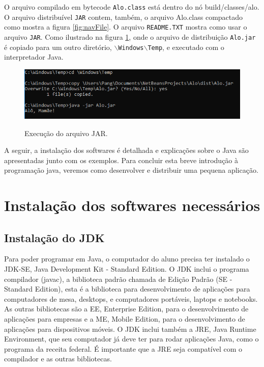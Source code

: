 \documentclass[
	12pt,				%
	twoside,			%
	a4paper,			%
	english,			%
	french,				%
	spanish,			%
	brazil				%
	]{abntex2}
\begin{document}
O arquivo compilado em bytecode \texttt{Alo.class} está dentro do nó build/classes/alo. O arquivo distribuível \texttt{JAR} contem, também, o arquivo Alo.class compactado como mostra a figura \ref{fig:navFile}. O arquivo \texttt{README.TXT} mostra como usar o arquivo \texttt{JAR}. Como ilustrado na figura \ref{fig:execJar}, onde o arquivo de distribuição \texttt{Alo.jar} é copiado para um outro diretório, \texttt{$\backslash$Windows$\backslash$Temp}, e executado com o interpretador Java.

\begin{figure}[h]
\begin{center}
\includegraphics[scale=0.4]{execJar.png} 
\caption{Execução do arquivo JAR.}
\label{fig:execJar}
\end{center}
\end{figure}

A seguir, a instalação dos softwares é detalhada e explicações sobre o Java são apresentadas junto com os exemplos. Para concluir esta breve introdução à programação java, veremos como desenvolver e distribuir uma pequena aplicação.


\chapter{Instalação dos softwares necessários} \label{part:inst}

\section{Instalação do JDK}
Para poder programar em Java, o computador do aluno precisa ter instalado o JDK-SE, Java Development Kit - Standard Edition. O JDK inclui o programa compilador (javac), a biblioteca padrão chamada de Edição Padrão (SE - Standard Edition), esta é a biblioteca para desenvolvimento de aplicações para computadores de mesa, desktops, e computadores portáveis, laptops e notebooks. As outras bibliotecas são a EE, Enterprise Edition, para o desenvolvimento de aplicações para empresas e a ME, Mobile Edition, para o desenvolvimento de aplicações para dispositivos móveis. O JDK inclui também a JRE, Java Runtime Environment, que seu computador já deve ter para rodar aplicações Java, como o programa da receita federal. É importante que a JRE seja compatível com o compilador e as outras bibliotecas.
\end{document}
